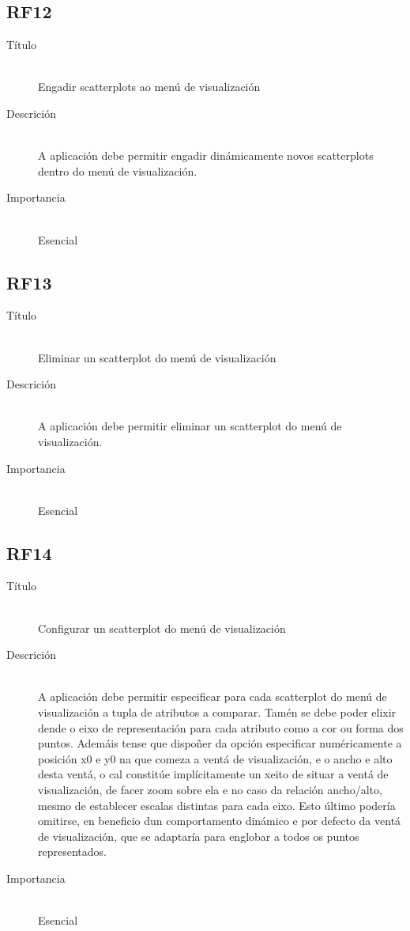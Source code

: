 \subsection*{RF12}
\begin{description}
\item[Título] \hfill \\
Engadir scatterplots ao menú de visualización
\item[Descrición] \hfill \\
A aplicación debe permitir engadir dinámicamente novos scatterplots dentro do menú de visualización.
\item[Importancia] \hfill \\
Esencial
\end{description}

\subsection*{RF13}
\begin{description}
\item[Título] \hfill \\
Eliminar un scatterplot do menú de visualización
\item[Descrición] \hfill \\
A aplicación debe permitir eliminar un scatterplot do menú de visualización.
\item[Importancia] \hfill \\
Esencial
\end{description}

\subsection*{RF14}
\begin{description}
\item[Título] \hfill \\
Configurar un scatterplot do menú de visualización
\item[Descrición] \hfill \\
A aplicación debe permitir especificar para cada scatterplot do menú de visualización a tupla de atributos a comparar. Tamén se debe poder elixir dende o eixo de representación para cada atributo como a cor ou forma dos puntos. Ademáis tense que dispoñer da opción especificar numéricamente a posición x0 e y0 na que comeza a ventá de visualización, e o ancho e alto desta ventá, o cal constitúe implícitamente un xeito de situar a ventá de visualización, de facer zoom sobre ela e no caso da relación ancho/alto, mesmo de establecer escalas distintas para cada eixo. Esto último podería omitirse, en beneficio dun comportamento dinámico e por defecto da ventá de visualización, que se adaptaría para englobar a todos os puntos representados.
\item[Importancia] \hfill \\
Esencial
\end{description}

